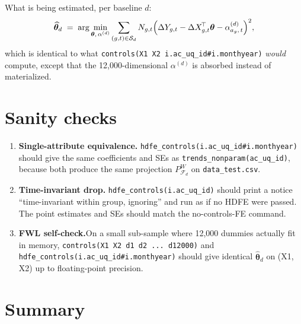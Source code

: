 \documentclass[11pt]{article}
\newcommand{\code}[1]{\texttt{\small #1}}
\newcommand{\1}{\mathbb{1}}
\newcommand{\Smpl}{\mathcal{S}}
\newcommand{\thetad}{\widehat{\bm{\theta}}_d}
\newcommand{\Ngt}{N_{g,t}}
\newcommand{\Pproj}{P^{\!W}}
\begin{document}
\noindent
What is being estimated, per baseline $d$:
\begin{equation}
\thetad \;=\; \arg\min_{\bm{\theta},\,\alpha^{(d)}}
\sum_{(g,t)\in\Smpl_d} \Ngt\Bigl(\Delta Y_{g,t} - \Delta X_{g,t}^{\!\top}\bm{\theta} - \alpha^{(d)}_{a_g,\,t}\Bigr)^{2},
\label{eq:est}
\end{equation}
which is identical to what \code{controls(X1 X2 i.ac\_uq\_id\#i.monthyear)}
\emph{would} compute, except that the 12{,}000-dimensional $\alpha^{(d)}$ is
absorbed instead of materialized.

\section{Sanity checks}

\begin{enumerate}[leftmargin=*, itemsep=2pt]
\item \textbf{Single-attribute equivalence.}\;
      \code{hdfe\_controls(i.ac\_uq\_id\#i.monthyear)} should give the same
      coefficients and SEs as \code{trends\_nonparam(ac\_uq\_id)}, because
      both produce the same projection $\Pproj_{\mathcal{F}_d}$ on
      \code{data\_test.csv}.
\item \textbf{Time-invariant drop.}\;
      \code{hdfe\_controls(i.ac\_uq\_id)} should print a notice
      ``time-invariant within group, ignoring'' and run as if no HDFE were
      passed. The point estimates and SEs should match the no-controls-FE
      command.
\item \textbf{FWL self-check.}\;On a small sub-sample where 12{,}000
      dummies actually fit in memory, \code{controls(X1 X2 d1 d2 ...
      d12000)} and \code{hdfe\_controls(i.ac\_uq\_id\#i.monthyear)} should
      give identical $\thetad$ on (X1, X2) up to floating-point precision.
\end{enumerate}

\section{Summary}
\end{document}

